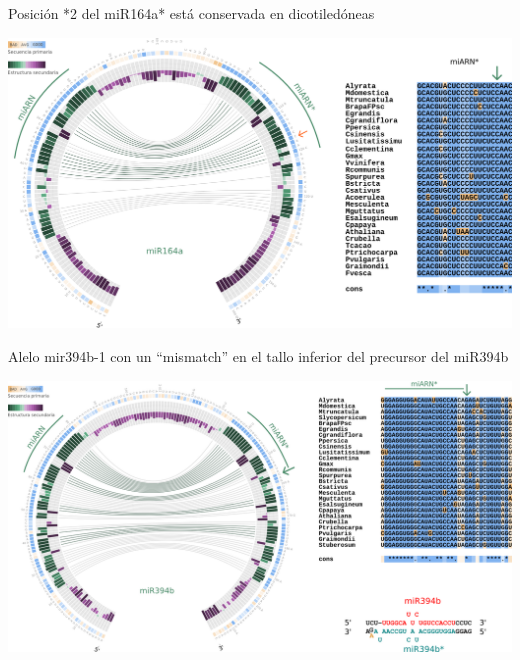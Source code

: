 \documentclass{beamer}
\begin{document}
\begin{frame}{Posición *2 del miR164a* está conservada  en dicotiledóneas}
	\begin{center}
		\includegraphics[width=.8\textwidth]{img/miR164a_circos.png}
	\end{center}
    \begin{center}
    \end{center}
\end{frame}

\begin{frame}{Alelo mir394b-1 con un ``mismatch'' en el tallo inferior del precursor del miR394b}
	\begin{center}
		\includegraphics[width=.8\textwidth]{img/miR394b_circos_aliniamientos.png}
	\end{center}
    \begin{center}
    \end{center}
\end{frame}
\end{document}
